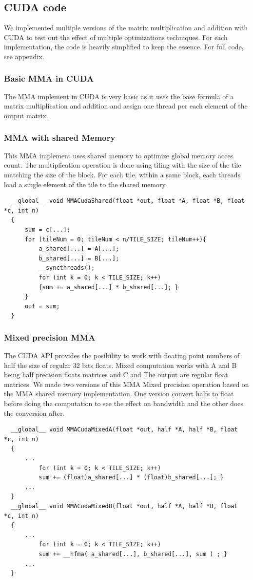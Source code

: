 \documentclass[conference]{IEEEtran}
\begin{document}
  \subsection{CUDA code}\label{sec:CudaCode}
  We implemented multiple versions of the matrix multiplication and addition with CUDA to
  test out the effect of multiple optimizations techniques. For each implementation, 
  the code is heavily simplified to keep the essence. For full code, see appendix.

  \subsubsection[short]{Basic MMA in CUDA}
  The MMA implement in CUDA is very basic as it uses the base formula of a matrix multiplication
  and addition and assign one thread per each element of the output matrix.\cite{Cpp_programming}


  \subsubsection[short]{MMA with shared Memory}
  This MMA implement uses shared memory to optimize global memory acces count. The multiplication operation 
  is done using tiling with the size of the tile matching the size of the block. For each tile, within
  a same block, each threads load a single element of the tile to the shared memory. 
  \begin{lstlisting}
  __global__ void MMACudaShared(float *out, float *A, float *B, float *c, int n)
  {   
      sum = c[...];
      for (tileNum = 0; tileNum < n/TILE_SIZE; tileNum++){
          a_shared[...] = A[...];
          b_shared[...] = B[...];
          __syncthreads();
          for (int k = 0; k < TILE_SIZE; k++)
          {sum += a_shared[...] * b_shared[...]; }
      }
      out = sum;
  }   
  \end{lstlisting}

  \subsubsection[short]{Mixed precision MMA}
  The CUDA API provides the posibility to work with floating point numbers of half the size of regular 32 bits floats.
  Mixed computation works with A and B being half precision floats matrices and C and The output are regular float matrices.
  We made two versions of this MMA Mixed precision operation based on the MMA shared memory implementation. One version
  convert halfs to float before doing the computation to see the effect on bandwidth and the other does the conversion after. 
  \begin{lstlisting}
  __global__ void MMACudaMixedA(float *out, half *A, half *B, float *c, int n)
  {   
      ...
          for (int k = 0; k < TILE_SIZE; k++)
          sum += (float)a_shared[...] * (float)b_shared[...]; }
      ...
  }
  __global__ void MMACudaMixedB(float *out, half *A, half *B, float *c, int n)
  {   
      ...
          for (int k = 0; k < TILE_SIZE; k++)
          sum += __hfma( a_shared[...], b_shared[...], sum ) ; }
      ...
  }
  \end{lstlisting}
\end{document}
